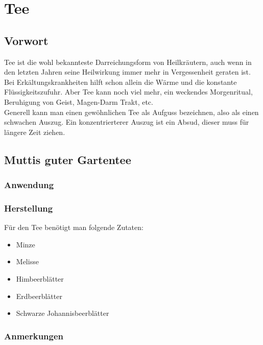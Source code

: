 \chapter{Tee}

\section{Vorwort}

Tee ist die wohl bekannteste Darreichungsform von Heilkräutern, auch wenn in den letzten Jahren seine Heilwirkung immer mehr in Vergessenheit geraten ist. Bei Erkältungskrankheiten hilft schon allein die Wärme und die konstante Flüssigkeitszufuhr. Aber Tee kann noch viel mehr, ein weckendes Morgenritual, Beruhigung von Geist, Magen-Darm Trakt, etc.\\

Generell kann man einen gewöhnlichen Tee als Aufguss bezeichnen, also als einen schwachen Auszug. Ein konzentrierterer Auszug ist ein Absud, dieser muss für längere Zeit ziehen.\\



\newpage



\section{Muttis guter Gartentee}

\subsection{Anwendung}

\subsection{Herstellung}

Für den Tee benötigt man folgende Zutaten:

\begin{itemize}
	\item Minze
	\item Melisse
	\item Himbeerblätter
	\item Erdbeerblätter
	\item Schwarze Johannisbeerblätter
\end{itemize}


\subsection{Anmerkungen}


